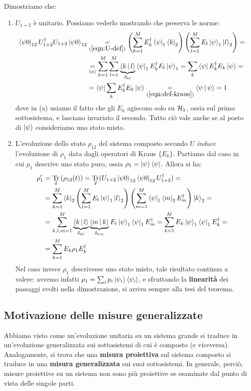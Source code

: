 \documentclass[../../InformazioneQuantistica.tex]{subfiles}
\begin{document}
Dimostriamo che:
\begin{enumerate}
\item $U_{1+2}$ è unitario. Possiamo vederlo mostrando che preserva le norme:
\begin{align*}
\Bra{\psi 0}_{12}U^\dag_{1+2} U_{1+2} \Ket{\psi 0}_{12} &\underset{(\ref{eqn:U-def})}{=} \left(\sum_{k=1}^M E_k^\dag \Bra{\psi}_1 \Bra{k}_2\right)
\left( \sum_{l=1}^M E_l \Ket{\psi}_1 \Ket{l}_2 \right) =\\
&\underset{(a)}{=} \sum_{k=1}^M \sum_{l=1}^M \underbrace{\Braket{k|l}}_{\delta_{kl}} \Bra{\psi}_1E_k^\dag E_l \Ket{\psi}_1 = \sum_{k} \Bra{\psi}E_k^\dag E_k \Ket{\psi}=\\
&=\Bra{\psi}\sum_k E_k^\dag E_k \Ket{\psi} \underset{(\ref{eqn:def-kraus})}{=}\Braket{\psi|\psi}=1
\end{align*}
dove in (a) usiamo il fatto che gli $E_k$ agiscono solo su $\mathcal{H}_1$, ossia sul primo sottosistema, e lasciano invariato il secondo. Tutto ciò vale anche se al posto di $\Ket{\psi}$ consideriamo uno stato misto.
\item L'evoluzione dello stato $\rho_{12}$ del sistema composto secondo $U$ \textit{induce} l'evoluzione di $\rho_1$ data dagli operatori di Kraus $\{E_k\}$. Partiamo dal caso in cui $\rho_1$ descrive uno stato puro, ossia $\rho_1 = \Ket{\psi}\Bra{\psi}$. Allora si ha:
\begin{align*}
\rho_1' &= \underset{2}{\operatorname{Tr}}\left(\rho_{12}(t)\right)=\underset{2}{\operatorname{Tr}}(U_{1+2}\Ket{\psi 0}_{12}\Bra{\psi0}_{12}U^\dag_{1+2}) = \\
&= \sum_{k=1}^M \Bra{k}_2\left(\sum_{l=1}^M E_l \Ket{\psi}_1\Ket{l}_2\right) \left(\sum_{m=1}^M \Bra{\psi}_1 \Bra{m}_2 E_m^\dag\right)\Ket{k}_2 =\\
&= \sum_{k,l,m=1}^M  \underbrace{\Braket{k|l}}_{\delta_{kl}}\underbrace{\Braket{m|k}}_{\delta_{km}}
E_l \Ket{\psi}_1 \Bra{\psi}_1 E_m^\dag = \sum_{k=1}^M E_k \Ket{\psi}_1\Bra{\psi}_1E_k^\dag =
\\
&= \sum_{k=1}^M E_k \rho_1 E_k^\dag
\end{align*}
Nel caso invece $\rho_1$ descrivesse uno stato misto, tale risultato continua a valere: avremo infatti $\rho_1 = \sum_i p_i \Ket{\psi_i}\Bra{\psi_i}$, e sfruttando la \textbf{linearità} dei passaggi svolti nella dimostrazione, si arriva sempre alla tesi del teorema.
\end{enumerate}

\subsection{Motivazione delle misure generalizzate}
Abbiamo visto come un'evoluzione unitaria su un sistema grande si traduce in un'evoluzione generalizzata sui sottosistemi di cui è composto (e viceversa).\\
Analogamente, si trova che una \textbf{misura proiettiva} sul sistema composto si traduce in una \textbf{misura generalizzata} sui suoi sottosistemi. In generale, perciò, misure proiettive su un sistema non sono più proiettive se esaminate dal punto di vista delle singole parti.\\
\end{document}
